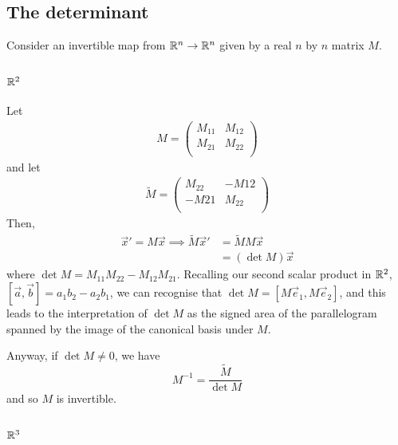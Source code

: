 \documentclass{../template/note}
\begin{document}
    \subsection{The determinant}
    
    Consider an invertible map from \(\mathbb R^n \to \mathbb R^n\) given by a real \(n\) by \(n\) matrix \(M\).

    \subsubsection{\(\mathbb R^2\)}

    Let
    \begin{align*}
        M = \begin{pmatrix}
         M_{11} & M_{12} \\
         M_{21} & M_{22} \\
        \end{pmatrix}
    \end{align*}
    and let
    \begin{align*}
        \tilde{M} = \begin{pmatrix}
         M_{22} & -M{12} \\
         -M{21} & M_{22} \\
        \end{pmatrix}
    \end{align*}
    Then,
    \begin{align*}
        \vec x' = M\vec x \implies \tilde M \vec x' &= \tilde MM \vec x \\
        &= (\det M) \vec x
    \end{align*}
    where \(\det M = M_{11}M_{22} - M_{12}M_{21}\). Recalling our second scalar product in \(\mathbb R^2\), \([\vec a, \vec b] = a_1b_2 - a_2b_1\), we can recognise that \(\det M = [M\vec e_1, M\vec e_2]\), and this leads to the interpretation of \(\det M\) as the signed area of the parallelogram spanned by the image of the canonical basis under \(M\).
    
    Anyway, if \(\det M \neq 0\), we have
    \[
        M^{-1} = \frac{\tilde M}{\det M}
    \]
    and so \(M\) is invertible.

    \subsubsection{\(\mathbb R^3\)}
\end{document}
